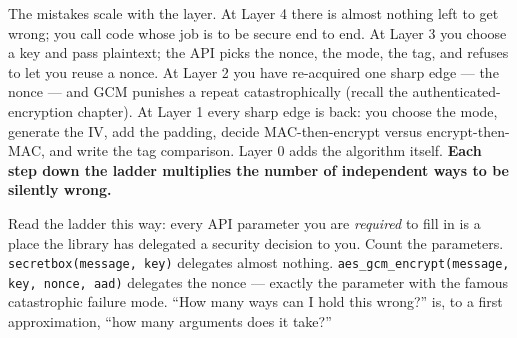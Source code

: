\begin{center}
\end{center}

The mistakes scale with the layer. At Layer 4 there is almost nothing left to get
wrong; you call code whose job is to be secure end to end. At Layer 3 you choose a
key and pass plaintext; the API picks the nonce, the mode, the tag, and refuses to
let you reuse a nonce. At Layer 2 you have re-acquired one sharp edge --- the nonce
--- and GCM punishes a repeat catastrophically (recall the authenticated-encryption
chapter). At Layer 1 every sharp edge is back: you choose the mode, generate the
IV, add the padding, decide MAC-then-encrypt versus encrypt-then-MAC, and write the
tag comparison. Layer 0 adds the algorithm itself. \textbf{Each step down the
ladder multiplies the number of independent ways to be silently wrong.}

\begin{intuitionbox}
Read the ladder this way: every API parameter you are \emph{required} to fill in is
a place the library has delegated a security decision to you. Count the parameters.
\texttt{secretbox(message, key)} delegates almost nothing.
\texttt{aes\_gcm\_encrypt(message, key, nonce, aad)} delegates the nonce ---
exactly the parameter with the famous catastrophic failure mode. ``How many ways
can I hold this wrong?'' is, to a first approximation, ``how many arguments does it
take?''
\end{intuitionbox}


